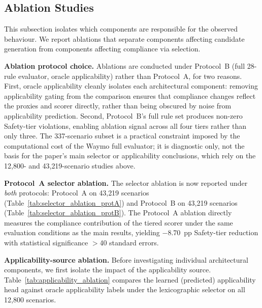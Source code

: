 \subsection{Ablation Studies}
\label{subsec:ablations_main}

This subsection isolates which components are responsible for the observed behaviour.  We report ablations that separate components affecting candidate generation from components affecting compliance via selection.

\textbf{Ablation protocol choice.}  Ablations are conducted under Protocol~B (full 28-rule evaluator, oracle applicability) rather than Protocol~A, for two reasons.  First, oracle applicability cleanly isolates each architectural component: removing applicability gating from the comparison ensures that compliance changes reflect the proxies and scorer directly, rather than being obscured by noise from applicability prediction.  Second, Protocol~B's full rule set produces non-zero Safety-tier violations, enabling ablation signal across all four tiers rather than only three.  The 337-scenario subset is a practical constraint imposed by the computational cost of the Waymo full evaluator; it is diagnostic only, not the basis for the paper's main selector or applicability conclusions, which rely on the 12{,}800- and 43{,}219-scenario studies above.

\noindent\textbf{Protocol~A selector ablation.}  The selector ablation is now reported under \emph{both} protocols: Protocol~A on 43{,}219 scenarios (Table~\ref{tab:selector_ablation_protA}) and Protocol~B on 43{,}219 scenarios (Table~\ref{tab:selector_ablation_protB}).  The Protocol~A ablation directly measures the compliance contribution of the tiered scorer under the same evaluation conditions as the main results, yielding $-$8.70~pp Safety-tier reduction with statistical significance $>$40 standard errors.

\noindent\textbf{Applicability-source ablation.}  Before investigating individual architectural components, we first isolate the impact of the applicability source.  Table~\ref{tab:applicability_ablation} compares the learned (predicted) applicability head against oracle applicability labels under the lexicographic selector on all 12{,}800 scenarios.

